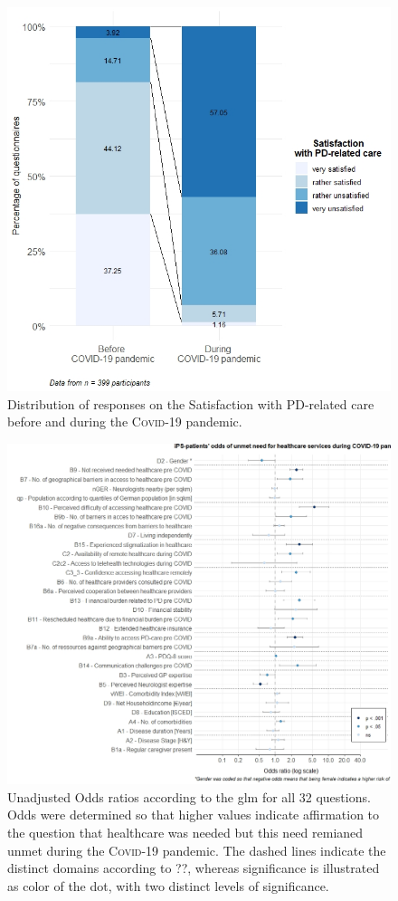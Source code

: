 \documentclass{bmcart}
\begin{document}
\begin{figure}
\centering
\includegraphics[width=.90\textwidth]{fig2.satisfaction.care.v1.0.jpeg}
\caption{Distribution of responses on the Satisfaction with PD-related care before and during the \textsc{Covid}-19 pandemic.}
\label{fig2:satisfaction}
\end{figure}

\begin{figure}
\centering
\includegraphics[width=.90\textwidth]{fig3.oddsratios.v1.0.jpeg}
\caption{Unadjusted Odds ratios according to the \ac{glm} for all 32 questions. Odds were determined so that higher values indicate affirmation to the question that healthcare was needed but this need remianed unmet during the \textsc{Covid}-19 pandemic. The dashed lines indicate the distinct domains according to ??, whereas significance is illustrated as color of the dot, with two distinct levels of significance. }%
\label{fig3:resultsOR1}
\end{figure}
\end{document}
